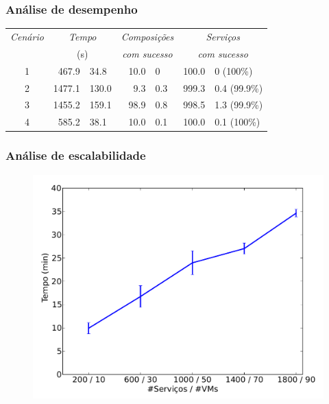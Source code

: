 \documentclass{beamer}
\begin{document}

\begin{frame}
\frametitle{Análise de desempenho}

\begin{table}
\centering
\begin{tabular}{c r@{ $\pm$ }l r@{ $\pm$ }l r@{ $\pm$ }l} \hline

\emph{Cenário} & \multicolumn{2}{c}{\emph{Tempo}} & \multicolumn{2}{c}{\emph{Composições}}   & \multicolumn{2}{c}{\emph{Serviços}}\\
                 & \multicolumn{2}{c}{(s)}           & \multicolumn{2}{c}{\emph{com sucesso}} & \multicolumn{2}{c}{\emph{com sucesso}}\\
\hline
1 &  467.9 &  34.8 & 10.0 & 0   & 100.0 & 0   (100\%) \\
2 & 1477.1 & 130.0 &  9.3 & 0.3 & 999.3 & 0.4 (99.9\%)\\
3 & 1455.2 & 159.1 & 98.9 & 0.8 & 998.5 & 1.3 (99.9\%)\\
4 &  585.2 &  38.1 & 10.0 & 0.1 & 100.0 & 0.1 (100\%)\\
\hline \end{tabular}
\end{table}

\end{frame}


\begin{frame}
\frametitle{Análise de escalabilidade}

\begin{figure}
\includegraphics[width=0.8\linewidth]{img/scalability}
\end{figure}

\end{frame}
\end{document}
